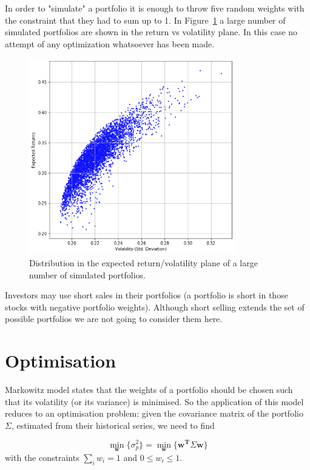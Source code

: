 In order to "simulate" a portfolio it is enough to throw five random weights 
with the constraint that they had to sum up to 1. 
In Figure~\ref{fig:mc_portfolio} a large number of simulated portfolios are shown in the return vs volatility plane. 
In this case no attempt of any optimization whatsoever has been made.

\begin{figure}[hbt]
\centering
\includegraphics[width=0.8\textwidth]{figures/return_variance}
\caption{Distribution in the expected return/volatility plane of a large number of simulated portfolios.}
\label{fig:mc_portfolio}
\end{figure}

Investors may use short sales in their portfolios (a portfolio is short in those stocks with negative portfolio weights). 
Although short selling extends the set of possible portfolios we are not going to consider them here.

\section{Optimisation}\label{optimization}

Markowitz model states that the weights of a portfolio should be chosen 
such that its volatility (or its variance) is minimised. 
So the application of this model reduces to
an optimisation problem: given the covariance matrix of the portfolio
$\Sigma$, estimated from their historical series, we need to find

\[\underset{\mathbf{w}}{\min}\{\sigma_p^2\} = \underset{\mathbf{w}}{\min}\{\mathbf{w^T}\Sigma\mathbf{w}\}\]
with the constraints \(\sum_{i}w_i = 1\) and \(0 \le w_i \le 1\).

